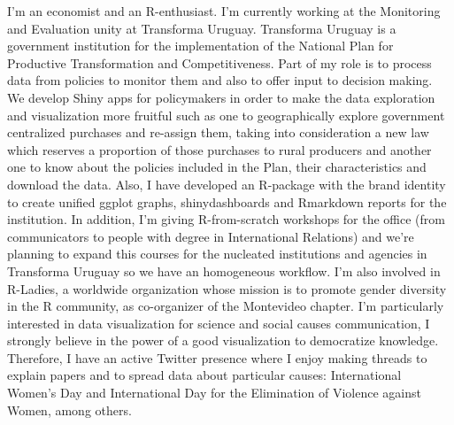 %
%
%
\par{
I'm an economist and an R-enthusiast. I'm currently working at the Monitoring and Evaluation unity at Transforma Uruguay. Transforma Uruguay is a government institution for the implementation of the National Plan for Productive Transformation and Competitiveness. Part of my role is to process data from policies to monitor them and also to offer input to decision making. We develop Shiny apps for policymakers in order to make the data exploration and visualization more fruitful such as one to geographically explore government centralized purchases and re-assign them, taking into consideration a new law which reserves a proportion of those purchases to rural producers and another one to know about the policies included in the Plan, their characteristics and download the data. Also, I have developed an R-package with the brand identity to create unified ggplot graphs, shinydashboards and Rmarkdown reports for the institution. In addition, I'm giving R-from-scratch workshops for the office (from communicators to people with degree in International Relations) and we're planning to expand this courses for the nucleated institutions and agencies in Transforma Uruguay so we have an homogeneous workflow. I'm also involved in R-Ladies, a worldwide organization whose mission is to promote gender diversity in the R community, as co-organizer of the Montevideo chapter. I'm particularly interested in data visualization for science and social causes communication, I strongly believe in the power of a good visualization to democratize knowledge. Therefore, I have an active Twitter presence where I enjoy making threads to explain  papers and to spread data about particular causes: International Women's Day and International Day for the Elimination of Violence against Women, among others.

}